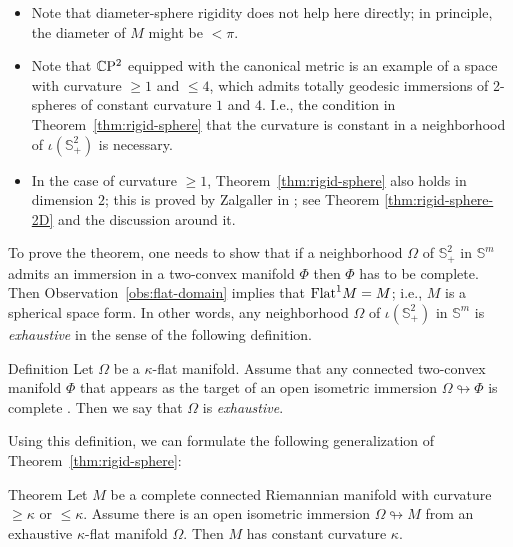 \documentclass[oneside,a4paper]{article}
\begin{document}
\begin{itemize}
\item Note that diameter-sphere rigidity does not help here directly;
in principle, the diameter of $M$ might be $<\pi$.

\item Note that  $\mathbb{C}\mathrm{P}^2$ equipped with the canonical metric
is an example of a space with curvature $\ge 1$ and $\le 4$,
which admits totally geodesic immersions of 2-spheres of constant curvature $1$ and $4$.
I.e., the condition in Theorem~\ref{thm:rigid-sphere}
that the curvature is constant in a neighborhood of $\iota(\mathbb S^2_+)$ is necessary.

\item In the case of curvature $\ge 1$,
Theorem~\ref{thm:rigid-sphere} also holds in dimension $2$;
this is proved by Zalgaller in \cite{zalgaller};
see Theorem \ref{thm:rigid-sphere-2D} and the discussion around it.
\end{itemize}

\medskip

To prove the theorem,
one needs to show that if a neighborhood $\Omega$ of $\mathbb S^2_+$
in $\mathbb S^m$
admits an immersion in a two-convex manifold $\Phi$ then $\Phi$ has to be complete.
Then  Observation~\ref{obs:flat-domain} implies that $\mathrm{Flat}^1 M=M$;
i.e., $M$ is a spherical space form.
In other words, any neighborhood $\Omega$ of $\iota(\mathbb S^2_+)$ in $\mathbb S^m$ is \emph{exhaustive} in the sense of the following definition.

\begin{thm}{Definition}\label{def:exhaustive}
Let $\Omega$ be a $\kappa$-flat manifold.
Assume that any connected two-convex manifold $\Phi$ that appears as the target of an open isometric immersion $\Omega\looparrowright\Phi$ is complete%
.
Then we say that $\Omega$ is \emph{exhaustive}.
\end{thm}

Using this definition,
we can formulate the following generalization of Theorem~\ref{thm:rigid-sphere}:

\begin{thm}{Theorem}\label{thm:exhaustive}
Let $M$ be a complete connected Riemannian manifold with curvature $\ge \kappa$ or $\le \kappa$.
Assume there is an open isometric immersion $\Omega\looparrowright M$
from an exhaustive $\kappa$-flat manifold $\Omega$.
Then $M$ has constant curvature $\kappa$.
\end{thm}
\end{document}
